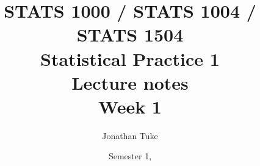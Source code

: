 \documentclass[handout]{beamer}
\title{STATS 1000 / STATS 1004 / STATS 1504\\
Statistical Practice 1\\
Lecture notes\\
Week 1}
\author[Jonathan Tuke]{Jonathan Tuke}
\institute[School of Math. Sci.]{School of Mathematical Sciences, University of Adelaide}
\date{Semester 1, \the\year}
\begin{document}
\frame{\titlepage}


\begin{frame}[fragile]{}



\end{frame}
\end{document}
